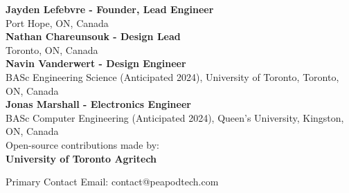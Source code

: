 \small{
    \textbf{Jayden Lefebvre - Founder, Lead Engineer}\\
    Port Hope, ON, Canada\\
    \vspace{.5cm}
    \textbf{Nathan Chareunsouk - Design Lead}\\Toronto, ON, Canada\\
    \vspace{.5cm}
    \textbf{Navin Vanderwert - Design Engineer}\\
    BASc Engineering Science (Anticipated 2024), University of Toronto, Toronto, ON, Canada\\
    \vspace{.5cm}
    \textbf{Jonas Marshall - Electronics Engineer}\\
    BASc Computer Engineering (Anticipated 2024), Queen's University, Kingston, ON, Canada\\
    \vspace{.5cm}
    Open-source contributions made by:\\
    \textbf{University of Toronto Agritech}
}

\vspace{1cm}

Primary Contact Email: contact@peapodtech.com